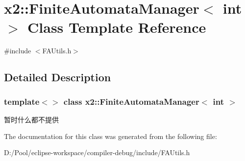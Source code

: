 \hypertarget{classx2_1_1_finite_automata_manager_3_01int_01_4}{}\section{x2\+:\+:Finite\+Automata\+Manager$<$ int $>$ Class Template Reference}
\label{classx2_1_1_finite_automata_manager_3_01int_01_4}


{\ttfamily \#include $<$F\+A\+Utils.\+h$>$}



\subsection{Detailed Description}
\subsubsection*{template$<$$>$\newline
class x2\+::\+Finite\+Automata\+Manager$<$ int $>$}

暂时什么都不提供 

The documentation for this class was generated from the following file\+:\begin{DoxyCompactItemize}
\item 
D\+:/\+Pool/eclipse-\/workspace/compiler-\/debug/include/F\+A\+Utils.\+h\end{DoxyCompactItemize}
